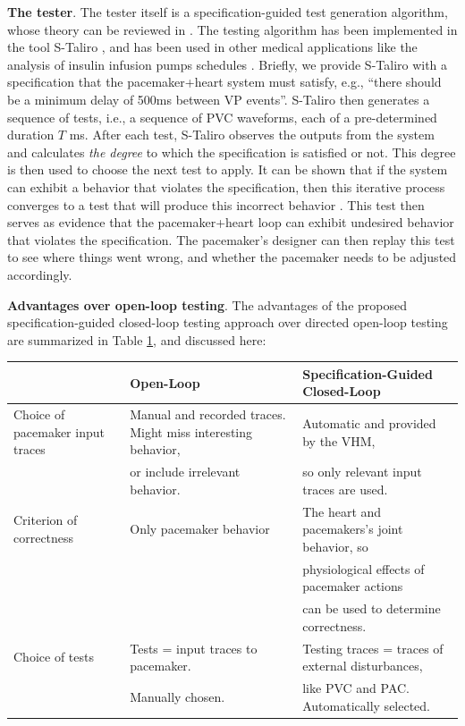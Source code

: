 \textbf{The tester}.
The tester itself is a specification-guided test generation algorithm, whose theory can be reviewed in \cite{AbbasFSIG13tecs}.
The testing algorithm has been implemented in the tool S-Taliro \cite{AnnapureddyLFS11tacas}, and has been used in other medical applications like the analysis of insulin infusion pumps schedules \cite{SankaranarayananF2012cmsb}.
Briefly, we provide S-Taliro with a specification that the pacemaker+heart system must satisfy,
e.g., ``there should be a minimum delay of 500ms between VP events''.
S-Taliro then generates a sequence of tests, i.e., a sequence of PVC waveforms, each of a pre-determined duration $T$ ms.
After each test, S-Taliro observes the outputs from the system and calculates \emph{the degree} to which the specification is satisfied or not.
This degree is then used to choose the next test to apply. 
It can be shown that if the system can exhibit a behavior that violates the specification, then this iterative process converges to a test that will produce this incorrect behavior \cite{AbbasF_HybridSA12}. 
This test then serves as evidence that the pacemaker+heart loop can exhibit undesired behavior that violates the specification.
The pacemaker's designer can then replay this test to see where things went wrong, and whether the pacemaker needs to be adjusted accordingly.

\textbf{Advantages over open-loop testing}.
The advantages of the proposed specification-guided closed-loop testing approach over directed open-loop testing are summarized in Table \ref{table:CLoverOL}, and discussed here:
\begin{table}
	\centering
	\begin{tabular}{|l|l|l|}
	\hline                       & Open-Loop    & Specification-Guided Closed-Loop 
	\\ 
	\hline Choice of pacemaker input traces  
	                & Manual and recorded traces. Might miss interesting behavior, &  Automatic and provided by the VHM,
	\\ 
					& or include irrelevant behavior. &  so only relevant input traces are used.
	\\
	\hline Criterion of correctness    & Only pacemaker behavior & The heart and pacemakers's joint behavior, so 
	\\
	                &                  & physiological effects of pacemaker actions
	\\
	                &                  &  can be used to determine correctness.                   
	\\ 
	\hline Choice of tests & Tests = input traces to pacemaker.  & Testing traces = traces of external disturbances, 
	\\
	                & Manually chosen.  & like PVC and PAC. Automatically selected.
	\\
	\hline 
\end{tabular}
\label{table:CLoverOL}
\end{table}

